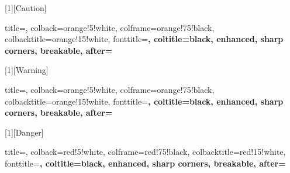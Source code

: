 [1][Caution]{%
  title=,
  colback=orange!5!white,
  colframe=orange!75!black,
  colbacktitle=orange!15!white,
  fonttitle=\bfseries,
  coltitle=black,
  enhanced, sharp corners, breakable,
  after=\par\vspace{6pt}
}

[1][Warning]{%
  title=,
  colback=orange!5!white,
  colframe=orange!75!black,
  colbacktitle=orange!15!white,
  fonttitle=\bfseries,
  coltitle=black,
  enhanced, sharp corners, breakable,
  after=\par\vspace{6pt}
}

[1][Danger]{%
  title=,
  colback=red!5!white,
  colframe=red!75!black,
  colbacktitle=red!15!white,
  fonttitle=\bfseries,
  coltitle=black,
  enhanced, sharp corners, breakable,
  after=\par\vspace{6pt}
}

\usepackage{xurl}

\usepackage{fancyhdr}
\setlength{\headheight}{15pt}


\pagestyle{fancy}
\fancyhf{}

\fancyhead[C]{\leftmark}        %

\rfoot{\thepage}                %

\renewcommand{\headrulewidth}{0pt}   %
\renewcommand{\footrulewidth}{0pt}     %
